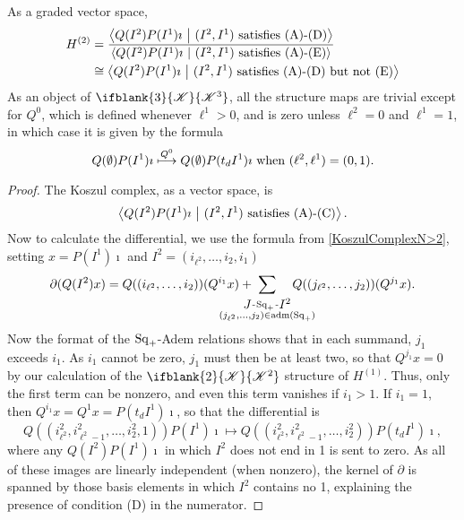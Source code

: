 \documentclass[10pt]{article}
\makeatletter
\newcommand{\LL}[1]{\ifblank{#1}{\scrK}{\scrK^{#1}}}
\newcommand{\produces}[3]{{#1}{#3}{#2}}
\newcommand{\admis}[1]{\mathrm{adm}(#1)}%
\renewcommand{\Q}{Q}
\newcommand{\SqShift}{\Sq_{\smash{+}}}
\newcommand{\Sq}{\mathrm{Sq}}
\renewcommand{\produces}[3]{
{
\def\labelstyle{\scriptstyle}
\xymatrix@C=2em@1{
{#1}
\ar@{-}[r]|-{{\,#3\,}}
&%
{#2}%
}}}
\makeatother
\begin{document}
\begin{CalculatingRepeatedKoszul}
\begin{prop}
As a graded vector space,
\begin{alignat*}{2}
H^{(2)}
&=
\frac{\left\langle \Q(I^2)P(I^1)\imath\ \middle|\  (I^2,I^1)\textup{ satisfies \textup{(A)}-\textup{(D)}}\right\rangle}{\left\langle \Q(I^2)P(I^1)\imath\ \middle|\  (I^2,I^1)\textup{ satisfies \textup{(A)}-\textup{(E)}}\right\rangle}%
\\
&\cong
{\left\langle \Q(I^2)P(I^1)\imath\ \middle|\  (I^2,I^1)\textup{ satisfies \textup{(A)}-\textup{(D)} but not \textup{(E)}}\right\rangle}%
\end{alignat*}
As an object of $\LL{3}$, all the structure maps are trivial except for $\Q^0$, which is defined whenever $\ell^1>0$, and is zero unless $\ell^2=0$ and $\ell^1=1$, in which case it is given by the formula \[\Q(\emptyset)P(I^1)\imath \overset{\Q^0}{\mapsto} \Q(\emptyset)P(t_dI^1)\imath\textup{ when $(\ell^2,\ell^1)=(0,1)$}.\]
\end{prop}
\begin{proof}
The Koszul complex, as a vector space, is \[\left\langle \Q(I^2)P(I^1)\imath\ \middle|\ (I^2,I^1)\textup{ satisfies \textup{(A)}-\textup{(C)}}\right\rangle.\] %
Now to calculate the differential, we use the formula from \ref{KoszulComplexN>2}, setting $x=P(I^1)\imath$ and $I^2=(i_{\ell^2},\ldots,i_2,i_1)$
\[\partial(\Q(I^2)x)=\Q((i_{\ell^2},\ldots,i_2))(\Q^{i_1}x)+\!\!\!\!\!\!\!\!\!\!\!\!\!\!\!\!\!\sum_{\substack{\produces{J}{I^2}{\SqShift}\\(j_{\ell^2},\ldots,j_2)\in\admis{\SqShift}}}\!\!\!\!\!\!\!\!\!\!\!\! \Q((j_{\ell^2},\ldots,j_2))(\Q^{j_1}x).\]
Now the format of the $\SqShift$-Adem relations shows that in each summand, $j_1$ exceeds $i_1$. As $i_1$ cannot be zero, $j_1$ must then be at least two, so that $Q^{j_1}x=0$ by our calculation of the $\LL{2}$ structure of $H^{(1)}$. Thus, only the first term can be nonzero, and even this term vanishes if $i_1>1$. If $i_1=1$, then $\Q^{i_1}x=\Q^1x=P(t_dI^1)\imath$, so that the differential is
\[\Q((i^2_{\ell^2},i^2_{\ell^2-1},\ldots,i^2_{2},1))P(I^1)\imath\mapsto \Q((i^2_{\ell^2},i^2_{\ell^2-1},\ldots,i^2_{2}))P(t_dI^1)\imath,\]
where any $\Q(I^2)P(I^1)\imath$ in which $I^2$ does not end in 1 is sent to zero. As all of these images are linearly independent (when nonzero), the kernel of $\partial$ is spanned by those basis elements in which $I^2$ contains no 1, explaining the presence of condition \textup{(D)} in the numerator.


\end{proof}
\end{CalculatingRepeatedKoszul}
\end{document}
